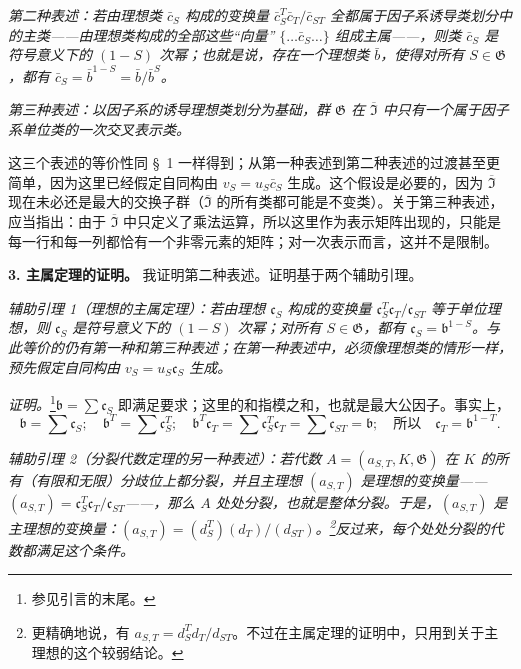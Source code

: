 \documentclass[11pt]{article}
\begin{document}
\emph{第二种表述：若由理想类 \(\bar c_S\) 构成的变换量 \(\bar c_S^T\bar c_T/\bar c_{ST}\) 全都属于因子系诱导类划分中的主类——由理想类构成的全部这些“向量” \(\{\ldots\bar c_S\ldots\}\) 组成主属——，则类 \(\bar c_S\) 是符号意义下的 \((1-S)\) 次幂；也就是说，存在一个理想类 \(\bar b\)，使得对所有 \(S\in\mathfrak G\)，都有 \(\bar c_S=\bar b^{1-S}=\bar b/\bar b^S\)。}

\emph{第三种表述：以因子系的诱导理想类划分为基础，群 \(\mathfrak G\) 在 \(\overline{\mathfrak I}\) 中只有一个属于因子系单位类的一次交叉表示类。}

这三个表述的等价性同 §~1 一样得到；从第一种表述到第二种表述的过渡甚至更简单，因为这里已经假定自同构由 \(v_S=u_S\bar c_S\) 生成。这个假设是必要的，因为 \(\overline{\mathfrak I}\) 现在未必还是最大的交换子群（\(\overline{\mathfrak I}\) 的所有类都可能是不变类）。关于第三种表述，应当指出：由于 \(\overline{\mathfrak I}\) 中只定义了乘法运算，所以这里作为表示矩阵出现的，只能是每一行和每一列都恰有一个非零元素的矩阵；对一次表示而言，这并不是限制。

\noindent\textbf{3. 主属定理的证明。} 我证明第二种表述。证明基于两个辅助引理。

\emph{辅助引理 1（理想的主属定理）：若由理想 \(\mathfrak c_S\) 构成的变换量 \(\mathfrak c_S^T\mathfrak c_T/\mathfrak c_{ST}\) 等于单位理想，则 \(\mathfrak c_S\) 是符号意义下的 \((1-S)\) 次幂；对所有 \(S\in\mathfrak G\)，都有 \(\mathfrak c_S=\mathfrak b^{1-S}\)。与此等价的仍有第一种和第三种表述；在第一种表述中，必须像理想类的情形一样，预先假定自同构由 \(v_S=u_S\mathfrak c_S\) 生成。}

\emph{证明。}\footnote{参见引言的末尾。}\(\mathfrak b=\sum\mathfrak c_S\) 即满足要求；这里的和指模之和，也就是最大公因子。事实上，
\[
\mathfrak b=\sum\mathfrak c_S;\quad
\mathfrak b^T=\sum\mathfrak c_S^T;\quad
\mathfrak b^T\mathfrak c_T=\sum\mathfrak c_S^T\mathfrak c_T
=\sum\mathfrak c_{ST}=\mathfrak b;\quad
\text{所以}\quad\mathfrak c_T=\mathfrak b^{1-T}.
\]

\emph{辅助引理 2（分裂代数定理的另一种表述）：若代数 \(A=(a_{S,T},K,\mathfrak G)\) 在 \(K\) 的所有（有限和无限）分歧位上都分裂，并且主理想 \((a_{S,T})\) 是理想的变换量——\((a_{S,T})=\mathfrak c_S^T\mathfrak c_T/\mathfrak c_{ST}\)——，那么 \(A\) 处处分裂，也就是整体分裂。于是，\((a_{S,T})\) 是主理想的变换量：\((a_{S,T})=(d_S^T)(d_T)/(d_{ST})\)。\footnote{更精确地说，有 \(a_{S,T}=d_S^Td_T/d_{ST}\)。不过在主属定理的证明中，只用到关于主理想的这个较弱结论。}反过来，每个处处分裂的代数都满足这个条件。}
\end{document}
